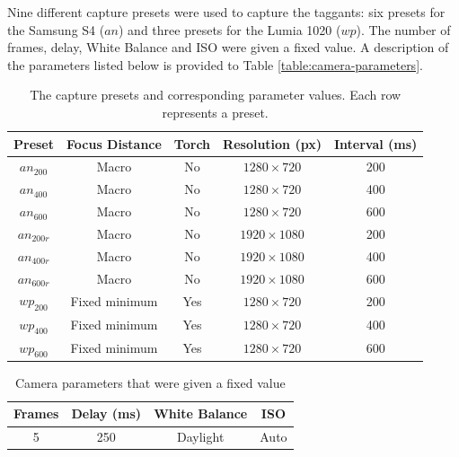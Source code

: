 \documentclass[thesis.tex]{subfiles}
\begin{document}
Nine different capture presets were used to capture the taggants: six presets for the Samsung S4 ($an$) and three presets for the Lumia 1020 ($wp$). The number of frames, delay, White Balance and ISO were given a fixed value. A description of the parameters listed below is provided to Table \ref{table:camera-parameters}.

\begin{table}[ht]
  \caption{The capture presets and corresponding parameter values. Each row represents a preset.}

  \begin{center}
  \begin{tabular}{| c | c | c | c | c |}
    \hline
    \textbf{Preset} & \textbf{Focus Distance} & \textbf{Torch} & \textbf{Resolution (px)} & \textbf{Interval (ms)} \\ \hline
    $an_{200}$ & Macro & No & $1280\times720$ & 200 \\
    \hline
    $an_{400}$ & Macro & No & $1280\times720$ & 400 \\
    \hline
    $an_{600}$ & Macro & No & $1280\times720$ & 600 \\
    \hline
    $an_{200r}$ & Macro & No & $1920\times1080$ & 200 \\
    \hline
    $an_{400r}$ & Macro & No & $1920\times1080$ & 400 \\
    \hline
    $an_{600r}$ & Macro & No & $1920\times1080$ & 600 \\
    \hline
    $wp_{200}$ & Fixed minimum & Yes & $1280\times720$ & 200 \\
    \hline
    $wp_{400}$ & Fixed minimum & Yes & $1280\times720$ & 400 \\
    \hline
    $wp_{600}$ & Fixed minimum & Yes & $1280\times720$ & 600 \\
    \hline
  \end{tabular}
  \end{center}
\end{table}

\begin{table}[ht]
  \caption{Camera parameters that were given a fixed value}

  \begin{center}
  \begin{tabular}{| c | c | c | c |}
    \hline
    \textbf{Frames}  & \textbf{Delay (ms)} & \textbf{White Balance} & \textbf{ISO} \\ \hline
    5 & 250 & Daylight & Auto \\
    \hline
  \end{tabular}
  \end{center}
\end{table}
\end{document}
